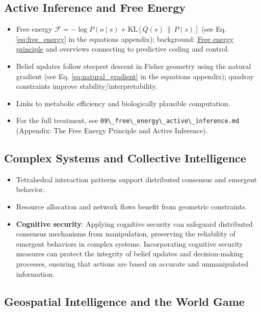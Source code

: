 \documentclass[
  10pt,
]{article}
\newcommand{\passthrough}[1]{#1}
\providecommand{\tightlist}{%
  \setlength{\itemsep}{0pt}\setlength{\parskip}{0pt}}
\begin{document}
\subsection{Active Inference and Free
Energy}\label{active-inference-and-free-energy}

\begin{itemize}
\tightlist
\item
  Free energy
  \(\mathcal{F} = -\log P(o\mid s) + \mathrm{KL}[Q(s)\,\|\,P(s)]\) (see
  Eq. \eqref{eq:free_energy} in the equations appendix); background:
  \href{https://en.wikipedia.org/wiki/Free_energy_principle}{Free energy
  principle} and overviews connecting to predictive coding and control.
\item
  Belief updates follow steepest descent in Fisher geometry using the
  natural gradient (see Eq. \eqref{eq:natural_gradient} in the equations
  appendix); quadray constraints improve stability/interpretability.
\item
  Links to metabolic efficiency and biologically plausible computation.
\item
  For the full treatment, see
  \passthrough{\lstinline!09\_free\_energy\_active\_inference.md!}
  (Appendix: The Free Energy Principle and Active Inference).
\end{itemize}

\subsection{Complex Systems and Collective
Intelligence}\label{complex-systems-and-collective-intelligence}

\begin{itemize}
\tightlist
\item
  Tetrahedral interaction patterns support distributed consensus and
  emergent behavior.
\item
  Resource allocation and network flows benefit from geometric
  constraints.
\item
  \textbf{Cognitive security}: Applying cognitive security can safeguard
  distributed consensus mechanisms from manipulation, preserving the
  reliability of emergent behaviors in complex systems. Incorporating
  cognitive security measures can protect the integrity of belief
  updates and decision-making processes, ensuring that actions are based
  on accurate and unmanipulated information.
\end{itemize}

\subsection{Geospatial Intelligence and the World
Game}\label{geospatial-intelligence-and-the-world-game}
\end{document}
